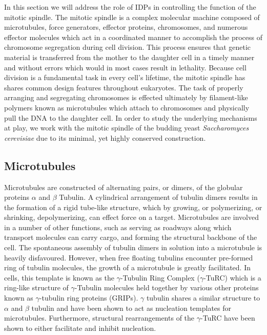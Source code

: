 In this section we will address the role of IDPs in controlling the function of the mitotic spindle. The mitotic spindle is a complex molecular machine composed of microtubules, force generators, effector proteins, chromosomes, and numerous effector molecules which act in a coordinated manner to accomplish the process of chromosome segregation during cell division. This process ensures that genetic material is transferred from the mother to the daughter cell in a timely manner and without errors which would in most cases result in lethality. Because cell division is a fundamental task in every cell's lifetime, the mitotic spindle has shares common design features throughout eukaryotes. The task of properly arranging and segregating chromosomes is effected ultimately by filament-like polymers known as microtubules which attach to chromosomes and physically pull the DNA to the daughter cell. In order to study the underlying mechanisms at play, we work with the mitotic spindle of the budding yeast {\it Saccharomyces cerevisiae} due to its minimal, yet highly conserved construction. 

\subsection{Microtubules}

Microtubules are constructed of alternating pairs, or dimers, of the globular proteins $\alpha$ and $\beta$ Tubulin. A cylindrical arrangement of tubulin dimers results in the formation of a rigid tube-like structure, which by growing, or polymerizing, or shrinking, depolymerizing, can effect force on a target. Microtubules are involved in a number of other functions, such as serving as roadways along which transport molecules can carry cargo, and forming the structural backbone of the cell. The spontaneous assembly of tubulin dimers in solution into a microtubule is heavily disfavoured. However, when free floating tubulins encounter pre-formed ring of tubulin molecules, the growth of a microtubule is greatly facilitated. In cells, this template is known as the $\gamma$-Tubulin Ring Complex ($\gamma$-TuRC) which is a ring-like structure of $\gamma$-Tubulin molecules held together by various other proteins known as $\gamma$-tubulin ring proteins (GRIPs). $\gamma$ tubulin shares a similar structure to $\alpha$ and $\beta$ tubulin and have been shown to act as nucleation templates for microtubules. Furthermore, structural rearrangements of the $\gamma$-TuRC have been shown to either facilitate and inhibit nucleation. 

